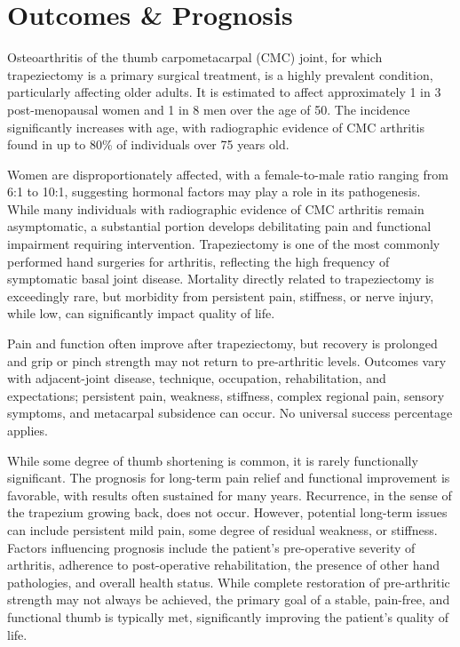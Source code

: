 \section*{Outcomes \& Prognosis}
Osteoarthritis of the thumb carpometacarpal (CMC) joint, for which trapeziectomy is a primary surgical treatment, is a highly prevalent condition, particularly affecting older adults. It is estimated to affect approximately 1 in 3 post-menopausal women and 1 in 8 men over the age of 50. The incidence significantly increases with age, with radiographic evidence of CMC arthritis found in up to 80\% of individuals over 75 years old. 

Women are disproportionately affected, with a female-to-male ratio ranging from 6:1 to 10:1, suggesting hormonal factors may play a role in its pathogenesis. While many individuals with radiographic evidence of CMC arthritis remain asymptomatic, a substantial portion develops debilitating pain and functional impairment requiring intervention. Trapeziectomy is one of the most commonly performed hand surgeries for arthritis, reflecting the high frequency of symptomatic basal joint disease. Mortality directly related to trapeziectomy is exceedingly rare, but morbidity from persistent pain, stiffness, or nerve injury, while low, can significantly impact quality of life.

Pain and function often improve after trapeziectomy, but recovery is prolonged and grip or pinch strength may not return to pre-arthritic levels. Outcomes vary with adjacent-joint disease, technique, occupation, rehabilitation, and expectations; persistent pain, weakness, stiffness, complex regional pain, sensory symptoms, and metacarpal subsidence can occur. No universal success percentage applies.

While some degree of thumb shortening is common, it is rarely functionally significant. The prognosis for long-term pain relief and functional improvement is favorable, with results often sustained for many years. Recurrence, in the sense of the trapezium growing back, does not occur. However, potential long-term issues can include persistent mild pain, some degree of residual weakness, or stiffness. Factors influencing prognosis include the patient's pre-operative severity of arthritis, adherence to post-operative rehabilitation, the presence of other hand pathologies, and overall health status. While complete restoration of pre-arthritic strength may not always be achieved, the primary goal of a stable, pain-free, and functional thumb is typically met, significantly improving the patient's quality of life.

